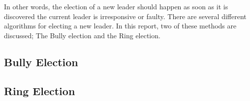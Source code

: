 In other words, the election of a new leader should happen as soon as it is discovered the current leader is irresponsive or faulty. There are several different algorithms for electing a new leader. In this report, two of these methods are discussed; The Bully election and the Ring election.

\subsection{Bully Election}

\subsection{Ring Election}





